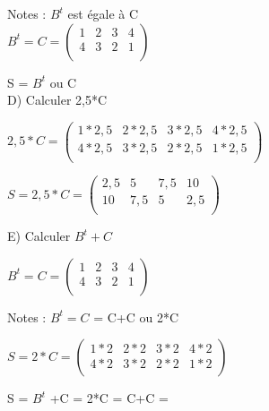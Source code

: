 Notes : $B^{t}$ est égale à C \\

$
B^{t} = C =
\begin{pmatrix}
  1 & 2 & 3 & 4 \\
  4 & 3 & 2 & 1 \\
\end{pmatrix}
$

\vspace{5mm} %

S = $B^{t}$ ou C\\

\vspace{10mm} %
D) Calculer 2,5*C

\vspace{5mm} %
$
2,5*C =
\begin{pmatrix}
  1*2,5 & 2*2,5 & 3*2,5 & 4*2,5 \\
  4*2,5 & 3*2,5 & 2*2,5 & 1*2,5 \\
\end{pmatrix}
$
\vspace{5mm} %

$
S = 2,5*C =
\begin{pmatrix}
  2,5 & 5 & 7,5 & 10 \\
  10 & 7,5 & 5 & 2,5 \\
\end{pmatrix}
$


\vspace{10mm} %
E) Calculer $B^{t} + C$

\vspace{5mm} %
$
B^{t} = C =
\begin{pmatrix}
  1 & 2 & 3 & 4 \\
  4 & 3 & 2 & 1 \\
\end{pmatrix}
$
\vspace{5mm} %

Notes : $B^{t} = C$ = C+C ou 2*C
\vspace{5mm} %

$
S = 2*C =
\begin{pmatrix}
  1*2 & 2*2 & 3*2 & 4*2 \\
  4*2 & 3*2 & 2*2 & 1*2 \\
\end{pmatrix}
$

\vspace{5mm} %
S = $ B^{t}$ +C = 2*C = C+C = \\

